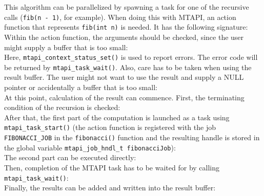 This algorithm can be parallelized by spawning a task for one of the recursive calls (\lstinline|fib(n - 1)|, for example). When doing this with MTAPI, an action function that represents \lstinline|fib(int n)| is needed. It has the following signature: 
%
\\
%
Within the action function, the arguments should be checked, since the user might supply a buffer that is too small:
%
\\
%
Here, \lstinline|mtapi_context_status_set()| is used to report errors. The error code will be returned by \lstinline|mtapi_task_wait()|. Also, care has to be taken when using the result buffer. The user might not want to use the result and supply a NULL pointer or accidentally a buffer that is too small:
%
\\
%
At this point, calculation of the result can commence. First, the terminating condition of the recursion is checked:
%
\\
%
After that, the first part of the computation is launched as a task using \lstinline|mtapi_task_start()| (the action function is registered with the job \lstinline|FIBONACCI_JOB| in the \lstinline|fibonacci()| function and the resulting handle is stored in the global variable \lstinline|mtapi_job_hndl_t fibonacciJob|):
%
\\
%
The second part can be executed directly:
%
\\
%
Then, completion of the MTAPI task has to be waited for by calling \lstinline|mtapi_task_wait()|:
%
\\
%
Finally, the results can be added and written into the result buffer:
%
\\
% 

